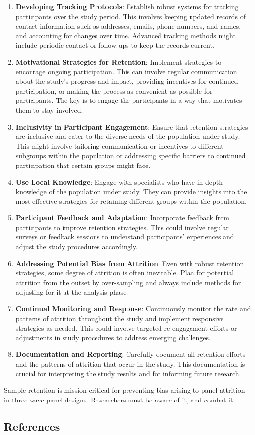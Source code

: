 \documentclass[
  singlecolumn,
  9pt]{article}
\begin{document}
\begin{enumerate}
\def\labelenumi{\arabic{enumi}.}
\item
  \textbf{Developing Tracking Protocols}: Establish robust systems for
  tracking participants over the study period. This involves keeping
  updated records of contact information such as addresses, emails,
  phone numbers, and names, and accounting for changes over time.
  Advanced tracking methods might include periodic contact or follow-ups
  to keep the records current.
\item
  \textbf{Motivational Strategies for Retention}: Implement strategies
  to encourage ongoing participation. This can involve regular
  communication about the study's progress and impact, providing
  incentives for continued participation, or making the process as
  convenient as possible for participants. The key is to engage the
  participants in a way that motivates them to stay involved.
\item
  \textbf{Inclusivity in Participant Engagement}: Ensure that retention
  strategies are inclusive and cater to the diverse needs of the
  population under study. This might involve tailoring communication or
  incentives to different subgroups within the population or addressing
  specific barriers to continued participation that certain groups might
  face.
\item
  \textbf{Use Local Knowledge}: Engage with specialists who have
  in-depth knowledge of the population under study. They can provide
  insights into the most effective strategies for retaining different
  groups within the population.
\item
  \textbf{Participant Feedback and Adaptation}: Incorporate feedback
  from participants to improve retention strategies. This could involve
  regular surveys or feedback sessions to understand participants'
  experiences and adjust the study procedures accordingly.
\item
  \textbf{Addressing Potential Bias from Attrition}: Even with robust
  retention strategies, some degree of attrition is often inevitable.
  Plan for potential attrition from the outset by over-sampling and
  always include methods for adjusting for it at the analysis phase.
\item
  \textbf{Continual Monitoring and Response}: Continuously monitor the
  rate and patterns of attrition throughout the study and implement
  responsive strategies as needed. This could involve targeted
  re-engagement efforts or adjustments in study procedures to address
  emerging challenges.
\item
  \textbf{Documentation and Reporting}: Carefully document all retention
  efforts and the patterns of attrition that occur in the study. This
  documentation is crucial for interpreting the study results and for
  informing future research.
\end{enumerate}

Sample retention is mission-critical for preventing bias arising to
panel attrition in three-wave panel designs. Researchers must be aware
of it, and combat it.

\subsection{References}\label{references-1}
\end{document}
